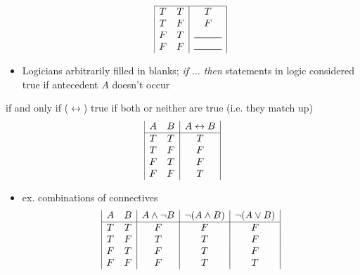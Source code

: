 \begin{enumdescription}
\begin{itemize}
\[\begin{array}{|c c|c|}
				      \hline
				      T & T & T                        \\
				      T & F & F                        \\
				      F & T & \rule{1cm}{0.15mm}       \\
				      F & F & \rule{1cm}{0.15mm}
			      \end{array}
		      \]
		\item Logicians arbitrarily filled in blanks; \textit{if $\dots$
			      then} statements in logic considered true if antecedent $A$ doesn't
		      occur
	\end{itemize}
	\item[if and only if ($\leftrightarrow$)] true if both or neither are true
	(i.e. they match up)
	\[
		\begin{array}{|c c|c|}
			A & B & A \leftrightarrow B \\
			\hline
			T & T & T                   \\
			T & F & F                   \\
			F & T & F                   \\
			F & F & T
		\end{array}
	\]
\end{enumdescription}
\begin{itemize}
	\item ex. combinations of connectives
	      \[
		      \begin{array}{|c c|c|c|c|}
			      A & B & A \land \lnot B & \lnot (A \land B) & \lnot (A \lor B) \\
			      \hline
			      T & T & F               & F                 & F                \\
			      T & F & T               & T                 & F                \\
			      F & T & F               & T                 & F                \\
			      F & F & F               & T                 & T
		      \end{array}
	      \]
\end{itemize}
